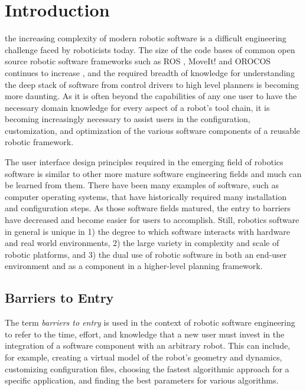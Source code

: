 \documentclass[10pt,journal,compsoc]{joser1}
\begin{document}
\section{Introduction}
 {the increasing complexity of modern robotic software is a difficult engineering challenge faced by roboticists today. The size of the code bases of common open source robotic software frameworks such as ROS \cite{quigley2009ros}, MoveIt! \cite{moveit} and OROCOS \cite{bruyninckx2001open} continues to increase \cite{makarenko2007benefits}, and the required breadth of knowledge for understanding the deep stack of software from control drivers to high level planners is becoming more daunting. As it is often beyond the capabilities of any one user to have the necessary domain knowledge for every aspect of a robot's tool chain, it is becoming increasingly necessary to assist users in the configuration, customization, and optimization of the various software components of a reusable robotic framework. 

The user interface design principles required in the emerging field of robotics software is similar to other more mature software engineering fields and much can be learned from them. There have been many examples of software, such as computer operating systems, that have historically required many installation and configuration steps. As those software fields matured, the entry to barriers have decreased and become easier for users to accomplish. Still, robotics software in general is unique in 1) the degree to which software interacts with hardware and real world environments, 2) the large variety in complexity and scale of robotic platforms, and 3) the dual use of robotic software in both an end-user environment and as a component in a higher-level planning framework. 

\subsection{Barriers to Entry}

The term \textit{barriers to entry} is used in the context of robotic software engineering to refer to the time, effort, and knowledge that a new user must invest in the integration of a software component with an arbitrary robot. This can include, for example, creating a virtual model of the robot's geometry and dynamics, customizing configuration files, choosing the fastest algorithmic approach for a specific application, and finding the best parameters for various algorithms.

}
\end{document}
